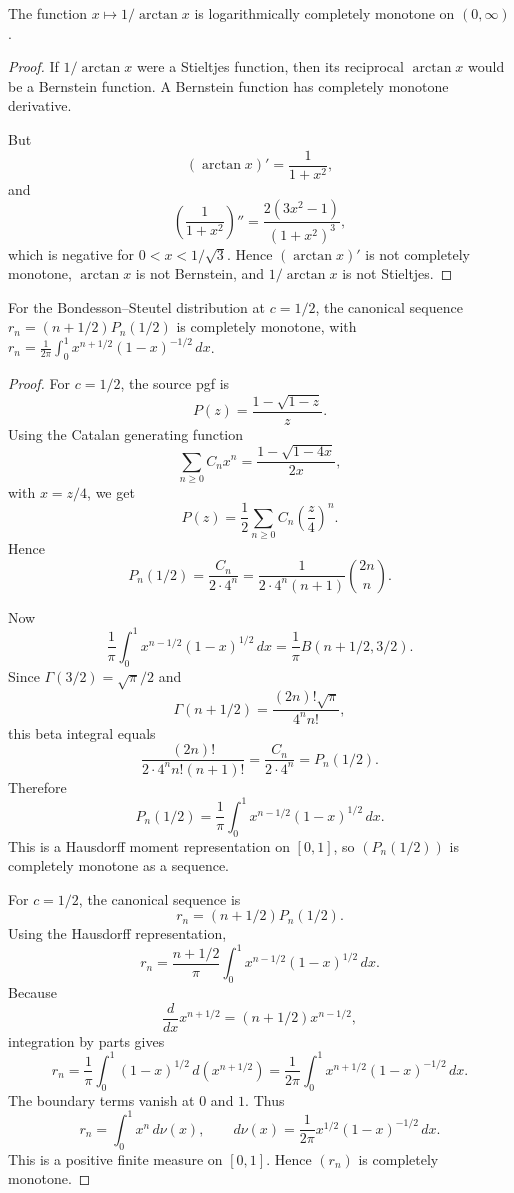 \begin{proposition}
\label{res:reciprocal-arctan-lcm}
The function \(x\mapsto1/\arctan x\) is logarithmically completely monotone on \((0,\infty)\).
\end{proposition}
\begin{proof}
If \(1/\arctan x\) were a Stieltjes function, then its reciprocal \(\arctan x\) would be a Bernstein function. A Bernstein function has completely monotone derivative.

But
\[
(\arctan x)'=\frac1{1+x^2},
\]
and
\[
\left(\frac1{1+x^2}\right)''
=\frac{2(3x^2-1)}{(1+x^2)^3},
\]
which is negative for \(0<x<1/\sqrt3\). Hence \((\arctan x)'\) is not completely monotone, \(\arctan x\) is not Bernstein, and \(1/\arctan x\) is not Stieltjes.
\end{proof}

\begin{proposition}
\label{res:bs-c-half-canonical-r-sequence-cm}
For the Bondesson--Steutel distribution at \(c=1/2\), the canonical sequence \(r_n=(n+1/2)P_n(1/2)\) is completely monotone, with \(r_n=\frac{1}{2\pi}\int_0^1 x^{n+1/2}(1-x)^{-1/2}\,dx\).
\end{proposition}
\begin{proof}
For \(c=1/2\), the source pgf is
\[
P(z)=\frac{1-\sqrt{1-z}}{z}.
\]
Using the Catalan generating function
\[
\sum_{n\ge0}C_n x^n=\frac{1-\sqrt{1-4x}}{2x},
\]
with \(x=z/4\), we get
\[
P(z)=\frac12\sum_{n\ge0}C_n\left(\frac z4\right)^n.
\]
Hence
\[
P_n(1/2)=\frac{C_n}{2\cdot4^n}
=\frac{1}{2\cdot4^n(n+1)}\binom{2n}{n}.
\]

Now
\[
\frac1\pi\int_0^1 x^{n-1/2}(1-x)^{1/2}\,dx
=\frac1\pi B(n+1/2,3/2).
\]
Since \(\Gamma(3/2)=\sqrt\pi/2\) and
\[
\Gamma(n+1/2)=\frac{(2n)!\sqrt\pi}{4^n n!},
\]
this beta integral equals
\[
\frac{(2n)!}{2\cdot4^n n!(n+1)!}
=\frac{C_n}{2\cdot4^n}
=P_n(1/2).
\]
Therefore
\[
P_n(1/2)=\frac1\pi\int_0^1 x^{n-1/2}(1-x)^{1/2}\,dx.
\]
This is a Hausdorff moment representation on \([0,1]\), so \((P_n(1/2))\) is completely monotone as a sequence.

For \(c=1/2\), the canonical sequence is
\[
r_n=(n+1/2)P_n(1/2).
\]
Using the Hausdorff representation,
\[
r_n=\frac{n+1/2}{\pi}\int_0^1 x^{n-1/2}(1-x)^{1/2}\,dx.
\]
Because
\[
\frac{d}{dx}x^{n+1/2}=(n+1/2)x^{n-1/2},
\]
integration by parts gives
\[
r_n
=\frac1\pi\int_0^1 (1-x)^{1/2}\,d(x^{n+1/2})
=\frac{1}{2\pi}\int_0^1 x^{n+1/2}(1-x)^{-1/2}\,dx.
\]
The boundary terms vanish at \(0\) and \(1\). Thus
\[
r_n=\int_0^1 x^n\,d\nu(x),
\qquad
d\nu(x)=\frac{1}{2\pi}x^{1/2}(1-x)^{-1/2}\,dx.
\]
This is a positive finite measure on \([0,1]\). Hence \((r_n)\) is completely monotone.
\end{proof}

